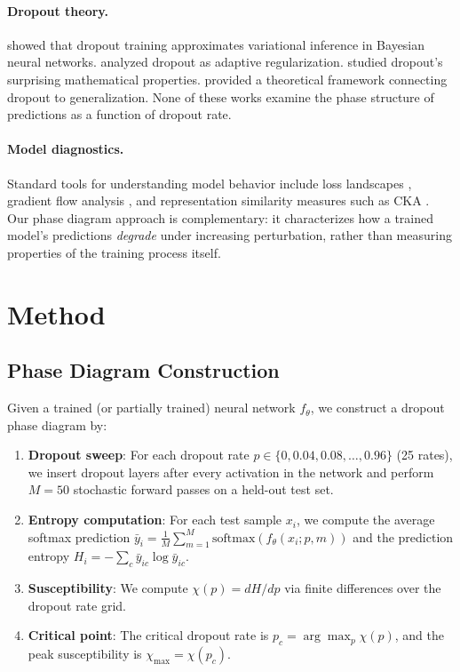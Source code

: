 \documentclass{article}
\begin{document}
\paragraph{Dropout theory.} \citet{gal2016dropout} showed that dropout training approximates variational inference in Bayesian neural networks. \citet{wager2013dropout} analyzed dropout as adaptive regularization. \citet{helmbold2017surprising} studied dropout's surprising mathematical properties. \citet{baldi2013understanding} provided a theoretical framework connecting dropout to generalization. None of these works examine the phase structure of predictions as a function of dropout rate.

\paragraph{Model diagnostics.} Standard tools for understanding model behavior include loss landscapes \citep{li2018visualizing}, gradient flow analysis \citep{pascanu2013difficulty}, and representation similarity measures such as CKA \citep{kornblith2019similarity}. Our phase diagram approach is complementary: it characterizes how a trained model's predictions \emph{degrade} under increasing perturbation, rather than measuring properties of the training process itself.

\section{Method}
\label{sec:method}

\subsection{Phase Diagram Construction}

Given a trained (or partially trained) neural network $f_\theta$, we construct a dropout phase diagram by:

\begin{enumerate}
    \item \textbf{Dropout sweep}: For each dropout rate $p \in \{0, 0.04, 0.08, \ldots, 0.96\}$ (25 rates), we insert dropout layers after every activation in the network and perform $M = 50$ stochastic forward passes on a held-out test set.
    \item \textbf{Entropy computation}: For each test sample $x_i$, we compute the average softmax prediction $\bar{y}_i = \frac{1}{M}\sum_{m=1}^{M} \text{softmax}(f_\theta(x_i; p, m))$ and the prediction entropy $H_i = -\sum_{c} \bar{y}_{ic} \log \bar{y}_{ic}$.
    \item \textbf{Susceptibility}: We compute $\chi(p) = dH/dp$ via finite differences over the dropout rate grid.
    \item \textbf{Critical point}: The critical dropout rate is $p_c = \arg\max_p \chi(p)$, and the peak susceptibility is $\chi_{\max} = \chi(p_c)$.
\end{enumerate}
\end{document}
